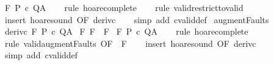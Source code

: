 \begin{isabellebody}
\ {\isachardoublequoteopen}{\isasymGamma}{\isacharcomma}{\isacharbraceleft}{\isacharbraceright}{\isasymturnstile}\isactrlbsub {\isacharslash}F\isactrlesub \ P\ c\ Q{\isacharcomma}A{\isachardoublequoteclose}\isanewline
%
\isadelimproof
\ \ %
\endisadelimproof
%
\isatagproof
{}\isamarkupfalse%
\ {\isacharparenleft}rule\ hoare{\isacharunderscore}complete{\isacharparenright}\isanewline
\ \ \isamarkupfalse%
\ {\isacharparenleft}rule\ valid{\isacharunderscore}restrict{\isacharunderscore}to{\isacharunderscore}valid{\isacharparenright}\isanewline
\ \ \isamarkupfalse%
\ {\isacharparenleft}insert\ hoare{\isacharunderscore}sound\ {\isacharbrackleft}OF\ deriv{\isacharunderscore}c{\isacharbrackright}{\isacharparenright}\isanewline
\ \ \isamarkupfalse%
\ {\isacharparenleft}simp\ add{\isacharcolon}\ cvalid{\isacharunderscore}def{\isacharparenright}%
\endisatagproof
{\isafoldproof}%
%
\isadelimproof
\isanewline
%
\endisadelimproof
\isanewline
{}\isamarkupfalse%
\ augment{\isacharunderscore}Faults{\isacharcolon}\isanewline
{}\ deriv{\isacharunderscore}c{\isacharcolon}\ {\isachardoublequoteopen}{\isasymGamma}{\isacharcomma}{\isacharbraceleft}{\isacharbraceright}{\isasymturnstile}\isactrlbsub {\isacharslash}F\isactrlesub \ P\ c\ Q{\isacharcomma}A{\isachardoublequoteclose}\isanewline
{}\ F{\isacharcolon}\ {\isachardoublequoteopen}F\ {\isasymsubseteq}\ F{\isacharprime}{\isachardoublequoteclose}\isanewline
{}\ {\isachardoublequoteopen}{\isasymGamma}{\isacharcomma}{\isacharbraceleft}{\isacharbraceright}{\isasymturnstile}\isactrlbsub {\isacharslash}F{\isacharprime}\isactrlesub \ P\ c\ Q{\isacharcomma}A{\isachardoublequoteclose}\isanewline
%
\isadelimproof
\ \ %
\endisadelimproof
%
\isatagproof
{}\isamarkupfalse%
\ {\isacharparenleft}rule\ hoare{\isacharunderscore}complete{\isacharparenright}\isanewline
\ \ \isamarkupfalse%
\ {\isacharparenleft}rule\ valid{\isacharunderscore}augment{\isacharunderscore}Faults\ {\isacharbrackleft}OF\ {\isacharunderscore}\ F{\isacharbrackright}{\isacharparenright}\isanewline
\ \ \isamarkupfalse%
\ {\isacharparenleft}insert\ hoare{\isacharunderscore}sound\ {\isacharbrackleft}OF\ deriv{\isacharunderscore}c{\isacharbrackright}{\isacharparenright}\isanewline
\ \ \isamarkupfalse%
\ {\isacharparenleft}simp\ add{\isacharcolon}\ cvalid{\isacharunderscore}def{\isacharparenright}%
\endisatagproof
{\isafoldproof}%
%
\isadelimproof
\isanewline
%
\endisadelimproof
%
\isadelimtheory
\isanewline
%
\endisadelimtheory
%
\isatagtheory
{}\isamarkupfalse%
%
\endisatagtheory
{\isafoldtheory}%
%
\isadelimtheory
%
\endisadelimtheory
%
\end{isabellebody}%
